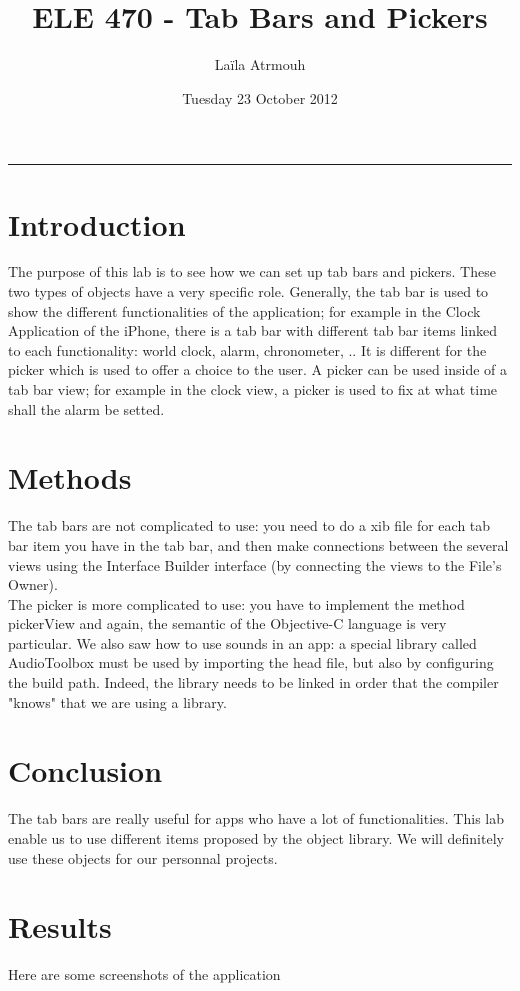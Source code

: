\documentclass[a4paper, 12pt, final]{article}
\title{ ELE 470 - Tab Bars and Pickers }
\author{ Laïla Atrmouh }
\date{Tuesday 23 October 2012}
\begin{document}
\maketitle  
   
\rule[0.5ex]{\textwidth}{0.1mm}
\section{Introduction}
The purpose of this lab is to see how we can set up tab bars and pickers. These two types of objects have a very specific role. Generally, the tab bar is used to show the different functionalities of the application; for example in the Clock Application of the iPhone, there is a tab bar with different tab bar items linked to each functionality: world clock, alarm, chronometer, .. It is different for the picker which is used to offer a choice to the user. A picker can be used inside of a tab bar view; for example in the clock view, a picker is used to fix at what time shall the alarm be setted.

\section{Methods}
The tab bars are not complicated to use: you need to do a xib file for each tab bar item you have in the tab bar, and then make connections between the several views using the Interface Builder interface (by connecting the views to the File's Owner). \\
The picker is more complicated to use: you have to implement the method pickerView and again, the semantic of the Objective-C language is very particular. We also saw how to use sounds in an app: a special library called AudioToolbox must be used by importing the head file, but also by configuring the build path. Indeed, the library needs to be linked in order that the compiler "knows" that we are using a library.

\section{Conclusion}
The tab bars are really useful for apps who have a lot of functionalities. This lab enable us to use different items proposed by the object library. We will definitely use these objects for our personnal projects.

\section{Results}
Here are some screenshots of the application\\ 
\end{document}
